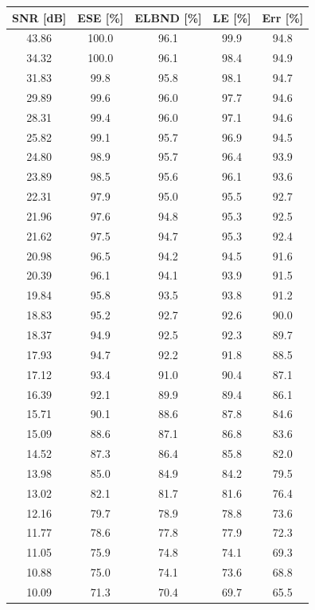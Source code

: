 \documentclass[11pt,twoside,openright]{report}
\begin{document}
\begin{appendices}
\begin{table}[!h]
\begin{center}
\begin{tabular}{|c|c|c|c|c|}
\hline
\textbf{SNR [dB]} & \textbf{ESE [\%]} & \textbf{ELBND [\%]} & \textbf{LE [\%]} & \textbf{Err [\%]} \\ 
\hline
43.86 & 100.0 & 96.1 & 99.9 & 94.8 \\ 
34.32 & 100.0 & 96.1 & 98.4 & 94.9 \\ 
31.83 & 99.8 & 95.8 & 98.1 & 94.7 \\ 
29.89 & 99.6 & 96.0 & 97.7 & 94.6 \\ 
28.31 & 99.4 & 96.0 & 97.1 & 94.6 \\  
25.82 & 99.1 & 95.7 & 96.9 & 94.5 \\ 
24.80 & 98.9 & 95.7 & 96.4 & 93.9 \\ 
23.89 & 98.5 & 95.6 & 96.1 & 93.6 \\  
22.31 & 97.9 & 95.0 & 95.5 & 92.7 \\ 
21.96 & 97.6 & 94.8 & 95.3 & 92.5 \\ 
21.62 & 97.5 & 94.7 & 95.3 & 92.4 \\ 
20.98 & 96.5 & 94.2 & 94.5 & 91.6 \\ 
20.39 & 96.1 & 94.1 & 93.9 & 91.5 \\ 
19.84 & 95.8 & 93.5 & 93.8 & 91.2 \\ 
18.83 & 95.2 & 92.7 & 92.6 & 90.0 \\ 
18.37 & 94.9 & 92.5 & 92.3 & 89.7 \\ 
17.93 & 94.7 & 92.2 & 91.8 & 88.5 \\  
17.12 & 93.4 & 91.0 & 90.4 & 87.1 \\ 
16.39 & 92.1 & 89.9 & 89.4 & 86.1 \\ 
15.71 & 90.1 & 88.6 & 87.8 & 84.6 \\ 
15.09 & 88.6 & 87.1 & 86.8 & 83.6 \\ 
14.52 & 87.3 & 86.4 & 85.8 & 82.0 \\ 
13.98 & 85.0 & 84.9 & 84.2 & 79.5 \\  
13.02 & 82.1 & 81.7 & 81.6 & 76.4 \\ 
12.16 & 79.7 & 78.9 & 78.8 & 73.6 \\ 
11.77 & 78.6 & 77.8 & 77.9 & 72.3 \\ 
11.05 & 75.9 & 74.8 & 74.1 & 69.3 \\ 
10.88 & 75.0 & 74.1 & 73.6 & 68.8 \\ 
10.09 & 71.3 & 70.4 & 69.7 & 65.5 \\ 

\end{tabular}
\end{center}
\end{table}
\end{appendices}
\end{document}
